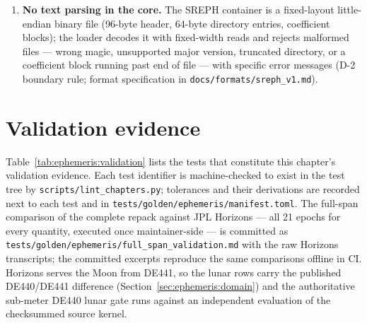 \begin{enumerate}
    position by at most $\approx \qty{8}{\milli\metre}$ --- three orders
    below the \qty{1}{\metre} validation gate. The boundary-continuity
    measurements of Section~\ref{sec:ephemeris:validation} reproduce this
    number: the observed step across one epoch ulp at a record boundary is
    the true motion over that interval.
  \item \textbf{No text parsing in the core.} The SREPH container is a
    fixed-layout little-endian binary file (96-byte header, 64-byte
    directory entries, coefficient blocks); the loader decodes it with
    fixed-width reads and rejects malformed files --- wrong magic,
    unsupported major version, truncated directory, or a coefficient block
    running past end of file --- with specific error messages
    (D-2 boundary rule; format specification in
    \texttt{docs/formats/sreph\_v1.md}).
\end{enumerate}

\section{Validation evidence}
\label{sec:ephemeris:validation}

Table~\ref{tab:ephemeris:validation} lists the tests that constitute this
chapter's validation evidence. Each test identifier is machine-checked to
exist in the test tree by \texttt{scripts/lint\_chapters.py}; tolerances and
their derivations are recorded next to each test and in
\texttt{tests/golden/ephemeris/manifest.toml}. The full-span comparison of
the complete repack against JPL Horizons --- all 21 epochs for every
quantity, executed once maintainer-side --- is committed as
\texttt{tests/golden/ephemeris/full\_span\_validation.md} with the raw
Horizons transcripts; the committed excerpts reproduce the same comparisons
offline in CI. Horizons serves the Moon from DE441, so the lunar rows
carry the published DE440/DE441 difference
(Section~\ref{sec:ephemeris:domain}) and the authoritative sub-meter DE440
lunar gate runs against an independent evaluation of the checksummed source
kernel.

